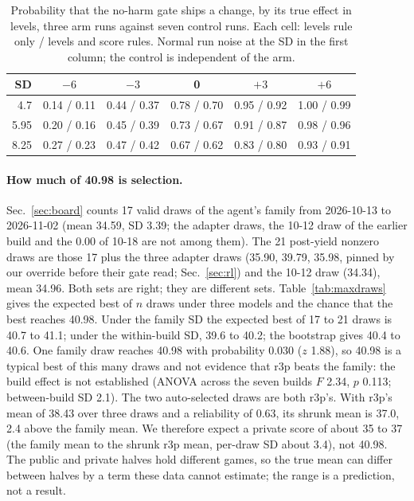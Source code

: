 \begin{table}[t]
\caption{Probability that the no-harm gate ships a change, by its true effect in levels, three arm runs against seven control runs. Each cell: levels rule only / levels and score rules. Normal run noise at the SD in the first column; the control is independent of the arm.}\label{tab:falseship} %
\centering\footnotesize
\setlength{\tabcolsep}{3.5pt}
\begin{tabular}{@{}rccccc@{}}
\toprule
SD & $-6$ & $-3$ & 0 & $+3$ & $+6$ \\
\midrule
4.7 & 0.14 / 0.11 & 0.44 / 0.37 & 0.78 / 0.70 & 0.95 / 0.92 & 1.00 / 0.99 \\
5.95 & 0.20 / 0.16 & 0.45 / 0.39 & 0.73 / 0.67 & 0.91 / 0.87 & 0.98 / 0.96 \\
8.25 & 0.27 / 0.23 & 0.47 / 0.42 & 0.67 / 0.62 & 0.83 / 0.80 & 0.93 / 0.91 \\
\bottomrule
\end{tabular}
\end{table}

\paragraph{How much of 40.98 is selection.}
Sec.~\ref{sec:board} counts 17 valid draws of the agent's family from 2026-10-13 to 2026-11-02 (mean 34.59, SD 3.39; the adapter draws, the 10-12 draw of the earlier build and the 0.00 of 10-18 are not among them). The 21 post-yield nonzero draws are those 17 plus the three adapter draws (35.90, 39.79, 35.98, pinned by our override before their gate read; Sec.~\ref{sec:rl}) and the 10-12 draw (34.34), mean 34.96. Both sets are right; they are different sets. %
Table~\ref{tab:maxdraws} gives the expected best of $n$ draws under three models and the chance that the best reaches 40.98. Under the family SD the expected best of 17 to 21 draws is 40.7 to 41.1; under the within-build SD, 39.6 to 40.2; the bootstrap gives 40.4 to 40.6. One family draw reaches 40.98 with probability 0.030 ($z$ 1.88), so 40.98 is a typical best of this many draws and not evidence that r3p beats the family: the build effect is not established (ANOVA across the seven builds $F$ 2.34, $p$ 0.113; between-build SD 2.1). %
The two auto-selected draws are both r3p's. With r3p's mean of 38.43 over three draws and a reliability of 0.63, its shrunk mean is 37.0, 2.4 above the family mean. We therefore expect a private score of about 35 to 37 (the family mean to the shrunk r3p mean, per-draw SD about 3.4), not 40.98. The public and private halves hold different games, so the true mean can differ between halves by a term these data cannot estimate; the range is a prediction, not a result. %

